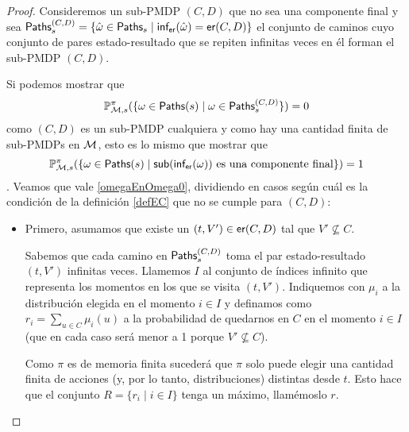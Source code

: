 \begin{proof}
	Consideremos un sub-PMDP $(C,D)$ que no sea una componente final y sea $\textsf{Paths}_s^{(C,D)} = \{\hat{\omega} \in \textsf{Paths}_s \mid \textsf{inf}_\textsf{er}(\hat{\omega}) = \textsf{er}(C, D)\}$ el conjunto de caminos cuyo conjunto de pares estado-resultado que se repiten infinitas veces en él forman el sub-PMDP $(C,D)$.

	Si podemos mostrar que
	\begin{equation}\label{omegaEnOmega0}
		\mathbb{P}^\pi_{\mathcal{M}, s}(\{ \omega \in \textsf{Paths}(s) \mid \omega \in \textsf{Paths}_s^{(C,D)}\}) = 0
	\end{equation}
	como $(C,D)$ es un sub-PMDP cualquiera y como hay una cantidad finita de sub-PMDPs en $\mathcal{M}$, esto es lo mismo que mostrar que
	$$\mathbb{P}^\pi_{\mathcal{M}, s}(\{ \omega \in \textsf{Paths}(s) \mid \textsf{sub}(\textsf{inf}_\textsf{er}(\omega)) \text{ es una componente final}\}) = 1$$.
	Veamos que vale \ref{omegaEnOmega0}, dividiendo en casos según cuál es la
	condición de la definición \ref{defEC} que no se cumple para $(C,D)$:

	\begin{itemize}
		\item Primero, asumamos que existe un $(t, V') \in \textsf{er}(C,D)$ tal que $V' \nsubseteq
			      C$.



		      Sabemos que cada camino en $\textsf{Paths}_s^{(C,D)}$ toma el par estado-resultado $(t,
			      V')$ infinitas veces. Llamemos $I$ al conjunto de índices infinito que
		      representa los momentos en los que se visita $(t, V')$. Indiquemos con $\mu_i$
		      a la distribución elegida en el momento $i \in I$ y definamos como $r_i =
			      \sum_{u \in C} \mu_i(u)$ a la probabilidad de quedarnos en $C$ en el momento $i
			      \in I$ (que en cada caso será menor a 1 porque $V' \nsubseteq C$). %

		      Como $\pi$ es de memoria finita sucederá que $\pi$ solo puede elegir una
		      cantidad finita de acciones (y, por lo tanto, distribuciones) distintas desde
		      $t$. Esto hace que el conjunto $R = \{r_i \mid i \in I\}$ tenga un máximo,
		      llamémoslo $r$.


\end{itemize}
\end{proof}

